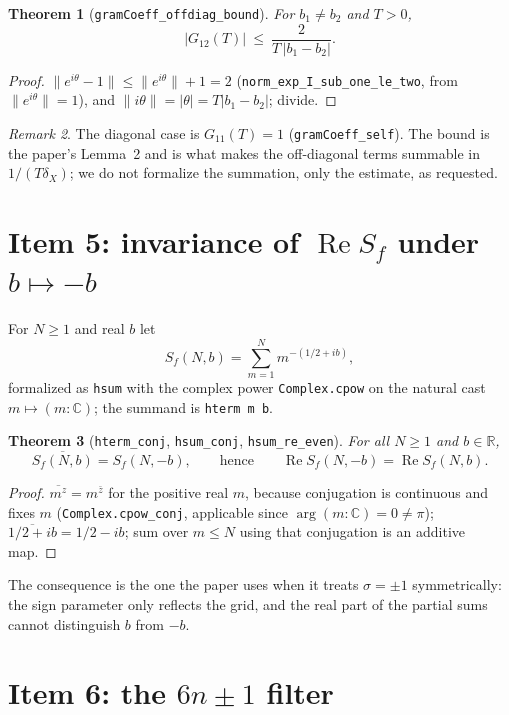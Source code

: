 \documentclass[11pt,a4paper]{article}
\newcommand{\R}{\mathbb{R}}
\newcommand{\C}{\mathbb{C}}
\newcommand{\lb}{\_\allowbreak}
\newcommand{\code}[1]{\texttt{#1}}
\newtheorem{theorem}{Theorem}[section]
\theoremstyle{definition}
\theoremstyle{remark}
\newtheorem{remark}[theorem]{Remark}
\begin{document}
\begin{theorem}[\code{gramCoeff\lb offdiag\lb bound}]
For $b_1\neq b_2$ and $T>0$,
\[
  |G_{12}(T)|\ \le\ \frac{2}{T\,|b_1-b_2|}.
\]
\end{theorem}
\begin{proof}
$\|e^{i\theta}-1\|\le\|e^{i\theta}\|+1=2$ (\code{norm\lb exp\lb I\lb sub\lb one\lb le\lb two},
from $\|e^{i\theta}\|=1$), and $\|i\theta\|=|\theta|=T|b_1-b_2|$; divide.
\end{proof}

\begin{remark}
The diagonal case is $G_{11}(T)=1$ (\code{gramCoeff\lb self}).  The bound is the paper's
Lemma~2 and is what makes the off-diagonal terms summable in $1/(T\delta_X)$; we do not
formalize the summation, only the estimate, as requested.
\end{remark}

\section{Item 5: invariance of $\operatorname{Re}S_f$ under $b\mapsto-b$}\label{sec:item5}

For $N\ge1$ and real $b$ let
\[
  S_f(N,b)=\sum_{m=1}^{N} m^{-(1/2+ib)},
\]
formalized as \code{hsum} with the complex power \code{Complex.cpow} on the natural cast
$m\mapsto(m:\C)$; the summand is \code{hterm m b}.

\begin{theorem}[\code{hterm\lb conj}, \code{hsum\lb conj}, \code{hsum\lb re\lb even}]
For all $N\ge1$ and $b\in\R$,
\[
  \overline{S_f(N,b)}=S_f(N,-b),
  \qquad\text{hence}\qquad
  \operatorname{Re}S_f(N,-b)=\operatorname{Re}S_f(N,b).
\]
\end{theorem}
\begin{proof}
$\overline{m^{z}}=m^{\bar z}$ for the positive real $m$, because conjugation is continuous
and fixes $m$ (\code{Complex.cpow\lb conj}, applicable since $\arg(m:\C)=0\neq\pi$);
$\overline{1/2+ib}=1/2-ib$; sum over $m\le N$ using that conjugation is an additive map.
\end{proof}

The consequence is the one the paper uses when it treats $\sigma=\pm1$ symmetrically: the
sign parameter only reflects the grid, and the real part of the partial sums cannot
distinguish $b$ from $-b$.

\section{Item 6: the $6n\pm1$ filter}\label{sec:item6}
\end{document}
